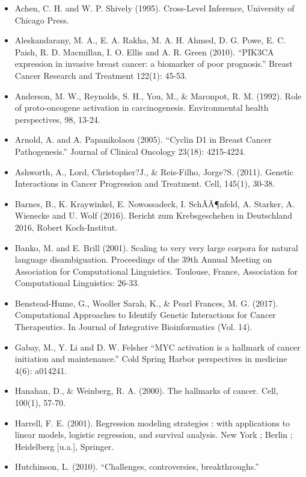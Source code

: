 \documentclass[]{article}
\providecommand{\tightlist}{%
  \setlength{\itemsep}{0pt}\setlength{\parskip}{0pt}}
\begin{document}
\begin{itemize}
\tightlist
\item
  Achen, C. H. and W. P. Shively (1995). Cross-Level Inference,
  University of Chicago Press.
\item
  Aleskandarany, M. A., E. A. Rakha, M. A. H. Ahmed, D. G. Powe, E. C.
  Paish, R. D. Macmillan, I. O. Ellis and A. R. Green (2010). ``PIK3CA
  expression in invasive breast cancer: a biomarker of poor prognosis.''
  Breast Cancer Research and Treatment 122(1): 45-53.
\item
  Anderson, M. W., Reynolds, S. H., You, M., \& Maronpot, R. M. (1992).
  Role of proto-oncogene activation in carcinogenesis. Environmental
  health perspectives, 98, 13-24.
\item
  Arnold, A. and A. Papanikolaou (2005). ``Cyclin D1 in Breast Cancer
  Pathogenesis.'' Journal of Clinical Oncology 23(18): 4215-4224.
\item
  Ashworth, A., Lord, Christopher?J., \& Reis-Filho, Jorge?S. (2011).
  Genetic Interactions in Cancer Progression and Treatment. Cell,
  145(1), 30-38.
\item
  Barnes, B., K. Kraywinkel, E. Nowossadeck, I. SchÃÂ¶nfeld, A.
  Starker, A. Wienecke and U. Wolf (2016). Bericht zum Krebsgeschehen in
  Deutschland 2016, Robert Koch-Institut.
\item
  Banko, M. and E. Brill (2001). Scaling to very very large corpora for
  natural language disambiguation. Proceedings of the 39th Annual
  Meeting on Association for Computational Linguistics. Toulouse,
  France, Association for Computational Linguistics: 26-33.
\item
  Benstead-Hume, G., Wooller Sarah, K., \& Pearl Frances, M. G. (2017).
  Computational Approaches to Identify Genetic Interactions for Cancer
  Therapeutics. In Journal of Integrative Bioinformatics (Vol. 14).
\item
  Gabay, M., Y. Li and D. W. Felsher ``MYC activation is a hallmark of
  cancer initiation and maintenance.'' Cold Spring Harbor perspectives
  in medicine 4(6): a014241.
\item
  Hanahan, D., \& Weinberg, R. A. (2000). The hallmarks of cancer. Cell,
  100(1), 57-70.
\item
  Harrell, F. E. (2001). Regression modeling strategies : with
  applications to linear models, logistic regression, and survival
  analysis. New York ; Berlin ; Heidelberg {[}u.a.{]}, Springer.
\item
  Hutchinson, L. (2010). ``Challenges, controversies, breakthroughs.''

\end{itemize}
\end{document}

